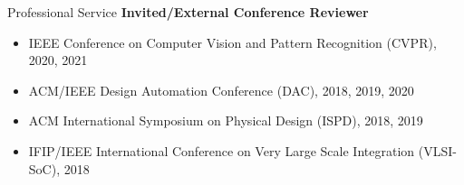 \begin{rSection}{Professional Service}
\textbf{Invited/External Conference Reviewer}
\begin{itemize}
    \item IEEE Conference on Computer Vision and Pattern Recognition (CVPR), 2020, 2021
    \item ACM/IEEE Design Automation Conference (DAC), 2018, 2019, 2020
    \item ACM International Symposium on Physical Design (ISPD), 2018, 2019
    \item IFIP/IEEE International Conference on Very Large Scale Integration (VLSI-SoC), 2018
\end{itemize}
\end{rSection}

